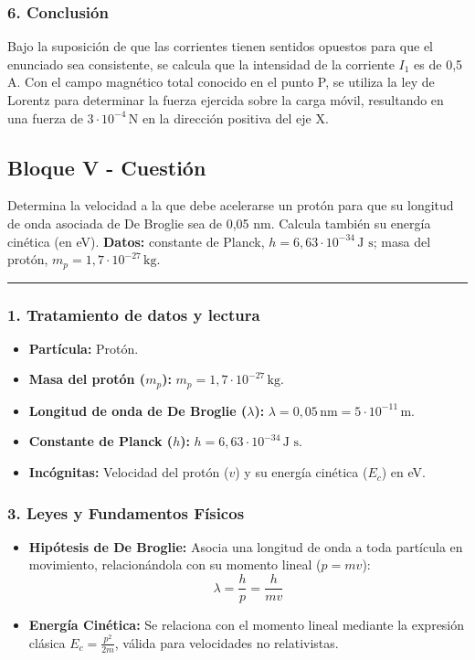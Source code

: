 \subsubsection*{6. Conclusión}
\begin{cajaconclusion}
Bajo la suposición de que las corrientes tienen sentidos opuestos para que el enunciado sea consistente, se calcula que la intensidad de la corriente $I_1$ es de 0,5 A. Con el campo magnético total conocido en el punto P, se utiliza la ley de Lorentz para determinar la fuerza ejercida sobre la carga móvil, resultando en una fuerza de $3\cdot10^{-4}\,\text{N}$ en la dirección positiva del eje X.
\end{cajaconclusion}
\newpage

\subsection{Bloque V - Cuestión}
\label{subsec:A5_2017_jul_ext}

\begin{cajaenunciado}
Determina la velocidad a la que debe acelerarse un protón para que su longitud de onda asociada de De Broglie sea de 0,05 nm. Calcula también su energía cinética (en eV).
\textbf{Datos:} constante de Planck, $h=6,63\cdot10^{-34}\,\text{J s}$; masa del protón, $m_{p}=1,7\cdot10^{-27}\,\text{kg}$.
\end{cajaenunciado}
\hrule

\subsubsection*{1. Tratamiento de datos y lectura}
\begin{itemize}
    \item \textbf{Partícula:} Protón.
    \item \textbf{Masa del protón ($m_p$):} $m_p = 1,7\cdot10^{-27}\,\text{kg}$.
    \item \textbf{Longitud de onda de De Broglie ($\lambda$):} $\lambda = 0,05\,\text{nm} = 5\cdot10^{-11}\,\text{m}$.
    \item \textbf{Constante de Planck ($h$):} $h = 6,63\cdot10^{-34}\,\text{J s}$.
    \item \textbf{Incógnitas:} Velocidad del protón ($v$) y su energía cinética ($E_c$) en eV.
\end{itemize}

\subsubsection*{3. Leyes y Fundamentos Físicos}
\begin{itemize}
    \item \textbf{Hipótesis de De Broglie:} Asocia una longitud de onda a toda partícula en movimiento, relacionándola con su momento lineal ($p=mv$):
    $$ \lambda = \frac{h}{p} = \frac{h}{mv} $$
    \item \textbf{Energía Cinética:} Se relaciona con el momento lineal mediante la expresión clásica $E_c = \frac{p^2}{2m}$, válida para velocidades no relativistas.
\end{itemize}

